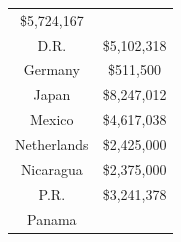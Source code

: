 \documentclass[]{book}
\theoremstyle{definition}
\theoremstyle{definition}
\theoremstyle{definition}
\theoremstyle{remark}
\begin{document}
\begin{longtable}[]{@{}cc@{}}
\begin{minipage}[t]{0.20\columnwidth}
\$5,724,167\strut
\end{minipage}\tabularnewline
\begin{minipage}[t]{0.20\columnwidth}\centering
D.R.\strut
\end{minipage} & \begin{minipage}[t]{0.20\columnwidth}\centering
\$5,102,318\strut
\end{minipage}\tabularnewline
\begin{minipage}[t]{0.20\columnwidth}\centering
Germany\strut
\end{minipage} & \begin{minipage}[t]{0.20\columnwidth}\centering
\$511,500\strut
\end{minipage}\tabularnewline
\begin{minipage}[t]{0.20\columnwidth}\centering
Japan\strut
\end{minipage} & \begin{minipage}[t]{0.20\columnwidth}\centering
\$8,247,012\strut
\end{minipage}\tabularnewline
\begin{minipage}[t]{0.20\columnwidth}\centering
Mexico\strut
\end{minipage} & \begin{minipage}[t]{0.20\columnwidth}\centering
\$4,617,038\strut
\end{minipage}\tabularnewline
\begin{minipage}[t]{0.20\columnwidth}\centering
Netherlands\strut
\end{minipage} & \begin{minipage}[t]{0.20\columnwidth}\centering
\$2,425,000\strut
\end{minipage}\tabularnewline
\begin{minipage}[t]{0.20\columnwidth}\centering
Nicaragua\strut
\end{minipage} & \begin{minipage}[t]{0.20\columnwidth}\centering
\$2,375,000\strut
\end{minipage}\tabularnewline
\begin{minipage}[t]{0.20\columnwidth}\centering
P.R.\strut
\end{minipage} & \begin{minipage}[t]{0.20\columnwidth}\centering
\$3,241,378\strut
\end{minipage}\tabularnewline
\begin{minipage}[t]{0.20\columnwidth}\centering
Panama\strut
\end{minipage} & \begin{minipage}[t]{0.20\columnwidth}\centering

\end{minipage}
\end{longtable}
\end{document}

